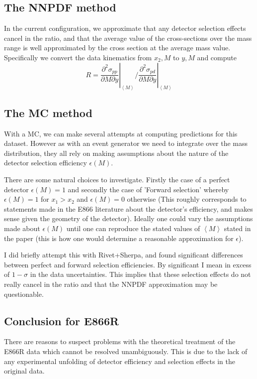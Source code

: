 \documentclass[11pt]{article}
\newcommand{\be}{\begin{equation}}
\newcommand{\ee}{\end{equation}}
\begin{document}
\subsection{The NNPDF method}
In the current configuration, we approximate that any detector selection effects cancel in the ratio, and
that the average value of the cross-sections over the mass range is well approximated by the cross section at
the average mass value. Specifically we convert the data kinematics from $x_2, M$ to $y, M$ and compute
\be R = \left.\frac{\partial^2\sigma_{pp}}{\partial M \partial y}\right|_{\left<M\right>} \bigg/ \left.\frac{\partial^2\sigma_{pd}}{\partial M \partial y}\right|_{\left<M\right>} \ee

\subsection{The MC method}
With a MC, we can make several attempts at computing predictions for this dataset. However as with an event
generator we need to integrate over the mass distribution, they all rely on making assumptions about the nature 
of the detector selection efficiency $\epsilon(M)$. 

There are some natural choices to investigate. Firstly the case of a perfect detector $\epsilon(M) = 1$ and secondly
the case of 'Forward selection' whereby $\epsilon(M) = 1$ for $x_1>x_2$ and $\epsilon(M) = 0$ otherwise (This roughly
corresponds to statements made in the E866 literature about the detector's efficiency, and makes sense given the
geometry of the detector). Ideally one could vary the assumptions made about $\epsilon(M)$ until one can reproduce
the stated values of $\left<M\right>$ stated in the paper (this is how one would determine a reasonable approximation
for $\epsilon$).

I did briefly attempt this with Rivet+Sherpa, and found significant differences between perfect and forward selection efficiencies.
By significant I mean in excess of $1-\sigma$ in the data uncertainties. This implies that these selection effects do not
really cancel in the ratio and that the NNPDF approximation may be questionable.

\subsection{Conclusion for E866R}

There are reasons to suspect problems with the theoretical treatment of the E866R data which cannot be resolved unambiguously.
This is due to the lack of any experimental unfolding of detector efficiency and selection effects in the original data.
\end{document}
